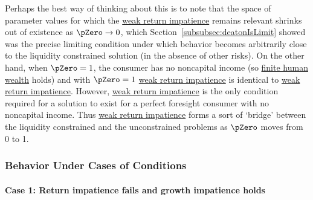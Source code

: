 \documentclass[BufferStockTheory]{subfiles}
\begin{document}
Perhaps the best way of thinking about this is to note that the space of parameter values for which the \hyperlink{WRIC}{weak return impatience}  remains relevant shrinks out of existence as $\pZero \rightarrow 0$, which Section~\ref{subsubsec:deatonIsLimit} showed was the precise limiting condition under which behavior becomes arbitrarily close to the liquidity constrained solution (in the absence of other risks).
On the other hand, when $\pZero = 1$, the consumer has no noncapital income (so \hyperlink{FHWC}{finite human wealth} holds) and with $\pZero=1$ \hyperlink{WRIC}{weak return impatience} is identical to \hyperlink{WRIC}{weak return impatience}.
However, \hyperlink{WRIC}{weak return impatience} is the only condition required for a solution to exist for a perfect foresight consumer with no noncapital income.
Thus \hyperlink{WRIC}{weak return impatience} forms a sort of `bridge' between the liquidity constrained and the unconstrained problems as $\pZero$ moves from 0 to 1.

\subsubsection{Behavior Under Cases of Conditions}\label{subsubsec:casesUC}

\hypertarget{IntuitionRIC}{}
\paragraph{Case 1: Return impatience fails and growth impatience holds} 
\end{document}
